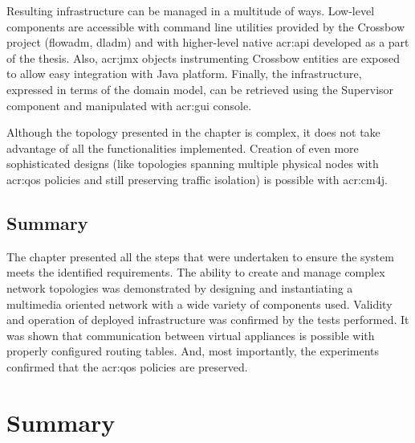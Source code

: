\documentclass[11pt,openany]{book}
\begin{document}
      Resulting infrastructure can be managed in a multitude of ways. Low-level components are accessible with command
      line utilities provided by the Crossbow project (flowadm, dladm) and with higher-level native \gls{acr:api}
      developed as a part of the thesis. Also, \gls{acr:jmx} objects instrumenting Crossbow entities are exposed to
      allow easy integration with Java platform. Finally, the infrastructure, expressed in terms of the domain model,
      can be retrieved using the Supervisor component and manipulated with \gls{acr:gui} console.

      Although the topology presented in the chapter is complex, it does not take advantage of all the functionalities
      implemented. Creation of even more sophisticated designs (like topologies spanning multiple physical nodes with
      \gls{acr:qos} policies and still preserving traffic isolation) is possible with \gls{acr:cm4j}.


    \section*{Summary}

      The chapter presented all the steps that were undertaken to ensure the system meets the identified requirements.
      The ability to create and manage complex network topologies was demonstrated by designing and instantiating
      a multimedia oriented network with a wide variety of components used. Validity and operation of deployed
      infrastructure was confirmed by the tests performed. It was shown that communication between virtual appliances is
      possible with properly configured routing tables. And, most importantly, the experiments confirmed that
      the \gls{acr:qos} policies are preserved.


  \chapter{Summary}
  \label{chap:sum}


\end{document}
